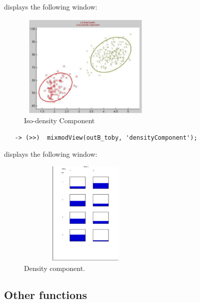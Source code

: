 \begin{itemize}
displays the following window:
\begin{figure}[h]
  \centering
  \includegraphics[width=6.5cm, height=5cm]{mixmodViewGeyser2DIsoDensityMatlab.eps}
  \caption{Iso-density Component}
  \label{mixmodViewGeyser2DMatlab}
\end{figure}




{\scriptsize
 \begin{verbatim}
   -> (>>)  mixmodView(outB_toby, 'densityComponent');
 \end{verbatim}
}



displays the following window:


\begin{figure}[!h]
  \centering
  \includegraphics[width=6.5cm, height=5cm]{mixmodViewB_toby2DDensityScilab.eps}
  \caption{Density component.}
  \label{mixmodViewB_toby2DDensityScilab}
\end{figure}


\end{itemize}


\vspace{3cm}




\subsection{Other functions}

